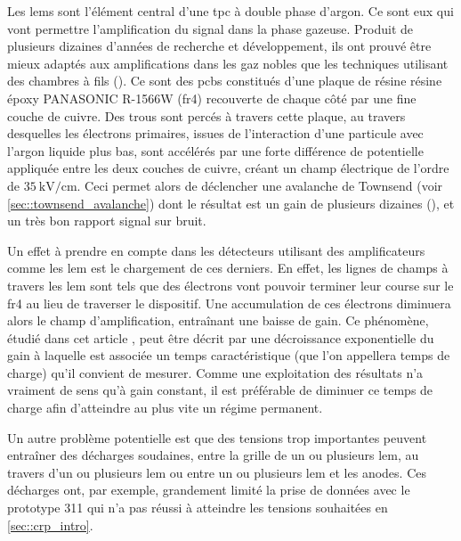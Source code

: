             Les \glspl{lem} sont l'élément central d'une \gls{tpc} à double phase d'argon. Ce sont eux qui vont permettre l'amplification du signal dans la phase gazeuse. Produit de plusieurs dizaines d'années de recherche et développement, ils ont prouvé être mieux adaptés aux amplifications dans les gaz nobles que les techniques utilisant des chambres à fils (\cite{GEM,THGEM}). Ce sont des \glspl{pcb} constitués d'une plaque de résine résine époxy PANASONIC R-1566W (\gls{fr4}) recouverte de chaque côté par une fine couche de cuivre. Des trous sont percés à travers cette plaque, au travers desquelles les électrons primaires, issues de l'interaction d'une particule avec l'argon liquide plus bas, sont accélérés par une forte différence de potentielle appliquée entre les deux couches de cuivre, créant un champ électrique de l'ordre de $\SI{35}{\kilo\volt\per\centi\meter}$. Ceci permet alors de déclencher une avalanche de Townsend (voir \autoref{sec::townsend_avalanche}) dont le résultat est un gain de plusieurs dizaines (\cite{3L}), et un très bon rapport signal sur bruit.
            
            Un effet à prendre en compte dans les détecteurs utilisant des amplificateurs comme les \gls{lem} est le chargement de ces derniers. En effet, les lignes de champs à travers les \gls{lem} sont tels que des électrons vont pouvoir terminer leur course sur le \gls{fr4} au lieu de traverser le dispositif. Une accumulation de ces électrons diminuera alors le champ d'amplification, entraînant une baisse de gain. Ce phénomène, étudié dans cet article \cite{3L}, peut être décrit par une décroissance exponentielle du gain à laquelle est associée un temps caractéristique (que l'on appellera temps de charge) qu'il convient de mesurer. Comme une exploitation des résultats n'a vraiment de sens qu'à gain constant, il est préférable de diminuer ce temps de charge afin d'atteindre au plus vite un régime permanent.
            
            Un autre problème potentielle est que des tensions trop importantes peuvent entraîner des décharges soudaines, entre la grille de un ou plusieurs \gls{lem}, au travers d'un ou plusieurs \gls{lem} ou entre un ou plusieurs \gls{lem} et les anodes. Ces décharges ont, par exemple, grandement limité la prise de données avec le prototype 311 qui n'a pas réussi à atteindre les tensions souhaitées en \autoref{sec::crp_intro}.
            
